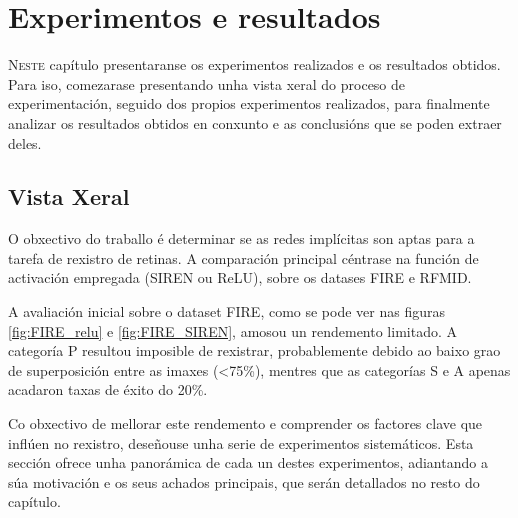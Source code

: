 \chapter{Experimentos e resultados}
\label{chap:Experimentos e resultados}
\lettrine{N}{este} capítulo presentaranse os experimentos realizados e os resultados obtidos.
Para iso, comezarase presentando unha vista xeral do proceso de experimentación, 
seguido dos propios experimentos realizados, para finalmente analizar os resultados obtidos en conxunto e as conclusións que se poden extraer deles.

\section{Vista Xeral}
\label{sec:Vista Xeral}

O obxectivo do traballo é determinar se as redes implícitas son aptas para a tarefa de rexistro de retinas. A comparación principal céntrase na función de activación empregada (SIREN ou ReLU), sobre os datases FIRE e RFMID.

A avaliación inicial sobre o dataset FIRE, como se pode ver nas figuras \ref{fig:FIRE_relu} e \ref{fig:FIRE_SIREN}, amosou un rendemento limitado. A categoría P resultou imposible de rexistrar, probablemente debido ao baixo grao de superposición entre as imaxes (<75\%), mentres que as categorías S e A apenas acadaron taxas de éxito do 20\%.

Co obxectivo de mellorar este rendemento e comprender os factores clave que inflúen no rexistro, deseñouse unha serie de experimentos sistemáticos. Esta sección ofrece unha panorámica de cada un destes experimentos, adiantando a súa motivación e os seus achados principais, que serán detallados no resto do capítulo.

